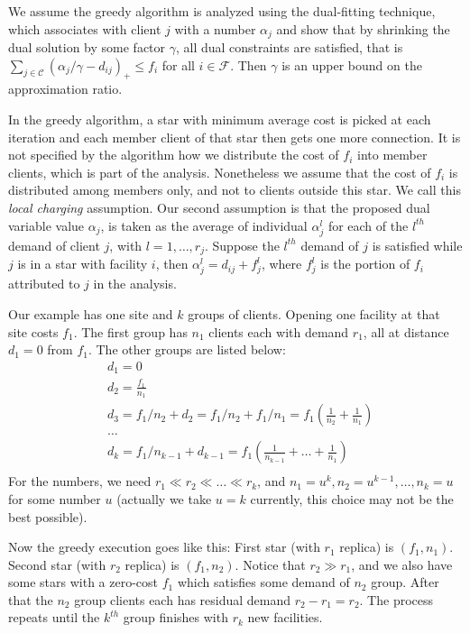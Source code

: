 \documentclass[oneside,final]{ucr}
\begin{document}
We assume the greedy algorithm is analyzed using the dual-fitting
technique, which associates with client $j$ with a number $\alpha_j$
and show that by shrinking the dual solution by some factor $\gamma$,
all dual constraints are satisfied, that is $\sum_{j\in \mathcal C}
(\alpha_j/\gamma - d_{ij})_+ \leq f_i$ for all $i\in \mathcal F$. Then
$\gamma$ is an upper bound on the approximation ratio.

In the greedy algorithm, a star with minimum average cost is picked at
each iteration and each member client of that star then gets one more
connection. It is not specified by the algorithm how we distribute the
cost of $f_i$ into member clients, which is part of the
analysis. Nonetheless we assume that the cost of $f_i$ is distributed
among members only, and not to clients outside this star. We call this
\emph{local charging} assumption. Our second assumption is that the
proposed dual variable value $\alpha_j$, is taken as the average of
individual $\alpha_j^l$ for each of the $l^{th}$ demand of client $j$,
with $l=1,\ldots,r_j$. Suppose the $l^{th}$ demand of $j$ is satisfied
while $j$ is in a star with facility $i$, then $\alpha_j^l = d_{ij} +
f_j^l$, where $f_j^l$ is the portion of $f_i$ attributed to $j$ in the
analysis.

Our example has one site and $k$ groups of clients. Opening one facility
at that site costs $f_1$. The first group has $n_1$ clients each with
demand $r_1$, all at distance $d_1 = 0$ from $f_1$. The other groups
are listed below:
\begin{align*}
  &d_1 = 0\\
  &d_2 = \frac{f_1}{n_1}\\
  &d_3 = f_1/n_2 + d_2 = f_1/n_2 + f_1/n_1 = f_1 (\frac{1}{n_2} + \frac{1}{n_1})\\
  &\ldots\\
  &d_k = f_1/n_{k-1} + d_{k-1} = f_1 (\frac{1}{n_{k-1}} + \ldots + \frac{1}{n_1})\\
\end{align*}
For the numbers, we need $r_1 \ll r_2 \ll \ldots \ll r_k$, and $n_1 =
u^k, n_2 = u^{k-1}, \ldots, n_k = u$ for some number $u$ (actually we
take $u=k$ currently, this choice may not be the best possible).

Now the greedy execution goes like this: First star (with $r_1$
replica) is $(f_1, n_1)$.  Second star (with $r_2$ replica) is $(f_1,
n_2)$. Notice that $r_2 \gg r_1$, and we also have some stars with a
zero-cost $f_1$ which satisfies some demand of $n_2$ group. After that
the $n_2$ group clients each has residual demand $r_2 - r_1 =
r_2$. The process repeats until the $k^{th}$ group finishes with $r_k$
new facilities.
\end{document}
